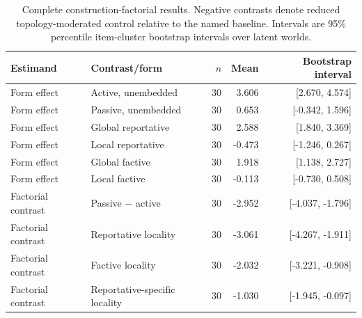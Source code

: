 \begin{table}[H]
\centering
\footnotesize
\setlength{\tabcolsep}{4pt}
\begin{tabularx}{\textwidth}{lXrrr}
\toprule
Estimand & Contrast/form & $n$ & Mean & Bootstrap interval \\
\midrule
Form effect & Active, unembedded & 30 & 3.606 & [2.670, 4.574] \\
Form effect & Passive, unembedded & 30 & 0.653 & [-0.342, 1.596] \\
Form effect & Global reportative & 30 & 2.588 & [1.840, 3.369] \\
Form effect & Local reportative & 30 & -0.473 & [-1.246, 0.267] \\
Form effect & Global factive & 30 & 1.918 & [1.138, 2.727] \\
Form effect & Local factive & 30 & -0.113 & [-0.730, 0.508] \\
Factorial contrast & Passive $-$ active & 30 & -2.952 & [-4.037, -1.796] \\
Factorial contrast & Reportative locality & 30 & -3.061 & [-4.267, -1.911] \\
Factorial contrast & Factive locality & 30 & -2.032 & [-3.221, -0.908] \\
Factorial contrast & Reportative-specific locality & 30 & -1.030 & [-1.945, -0.097] \\
\bottomrule
\end{tabularx}
\caption{Complete construction-factorial results. Negative contrasts denote reduced topology-moderated control relative to the named baseline. Intervals are 95\% percentile item-cluster bootstrap intervals over latent worlds.}
\label{tab:factorial}
\end{table}
